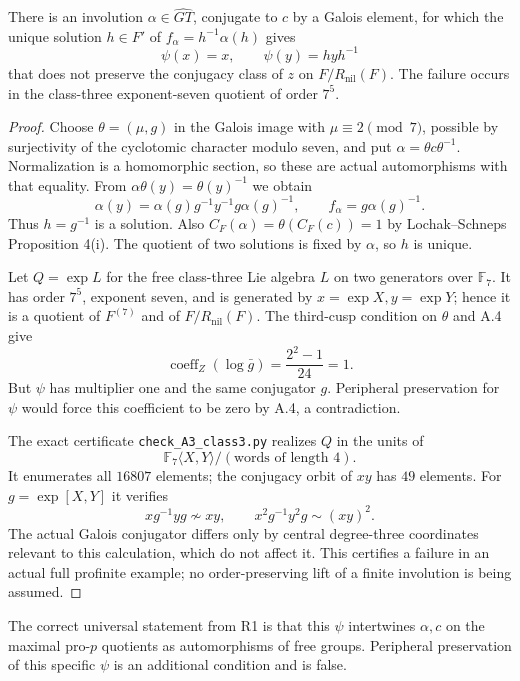 There is an involution \(\alpha\in\widehat{GT}\), conjugate
to \(c\) by a Galois element, for which the unique solution
\(h\in F'\) of \(f_\alpha=h^{-1}\alpha(h)\) gives
\[
                 \psi(x)=x,\qquad\psi(y)=hyh^{-1}
\]
that does not preserve the conjugacy class of \(z\)
on \(F/R_{\mathrm{nil}}(F)\). The failure occurs in
the class-three exponent-seven quotient of order \(7^5\).

\begin{proof}
Choose \(\theta=(\mu,g)\) in the Galois image with
\(\mu\equiv2\pmod7\), possible by surjectivity of the
cyclotomic character modulo seven, and put
\(\alpha=\theta c\theta^{-1}\).
Normalization is a homomorphic section, so these
are actual automorphisms with that equality.
From \(\alpha\theta(y)=\theta(y)^{-1}\) we obtain
\[
 \alpha(y)=\alpha(g)g^{-1}y^{-1}g\alpha(g)^{-1},
 \qquad f_\alpha=g\alpha(g)^{-1}.
\]
Thus \(h=g^{-1}\) is a solution. Also
\(C_F(\alpha)=\theta(C_F(c))=1\) by
Lochak--Schneps Proposition 4(i). The quotient of two
solutions is fixed by \(\alpha\), so \(h\) is unique.

Let \(Q=\exp L\) for the free class-three Lie algebra
\(L\) on two generators over \(\mathbb F_7\).
It has order \(7^5\), exponent seven, and is generated
by \(x=\exp X,y=\exp Y\); hence it is a quotient of
\(F^{(7)}\) and of \(F/R_{\mathrm{nil}}(F)\).
The third-cusp condition on \(\theta\) and A.4 give
\[
       \operatorname{coeff}_Z(\log\bar g)
                    =\frac{2^2-1}{24}=1 .
\]
But \(\psi\) has multiplier one and the same conjugator
\(g\). Peripheral preservation for \(\psi\) would force
this coefficient to be zero by A.4, a contradiction.

The exact certificate \texttt{check\_A3\_class3.py}
realizes \(Q\) in the units of
\[
 \mathbb F_7\langle X,Y\rangle/(\text{words of length }4).
\]
It enumerates all \(16807\) elements; the conjugacy
orbit of \(xy\) has \(49\) elements. For
\(g=\exp[X,Y]\) it verifies
\[
 xg^{-1}yg\not\sim xy,\qquad
 x^2g^{-1}y^2g\sim(xy)^2 .
\]
The actual Galois conjugator differs only by central
degree-three coordinates relevant to this calculation,
which do not affect it. This certifies a failure in
an actual full profinite example; no order-preserving
lift of a finite involution is being assumed.
\end{proof}

The correct universal statement from R1 is that this
\(\psi\) intertwines \(\alpha,c\) on the maximal
pro-\(p\) quotients as automorphisms of free groups.
Peripheral preservation of this specific \(\psi\)
is an additional condition and is false.


